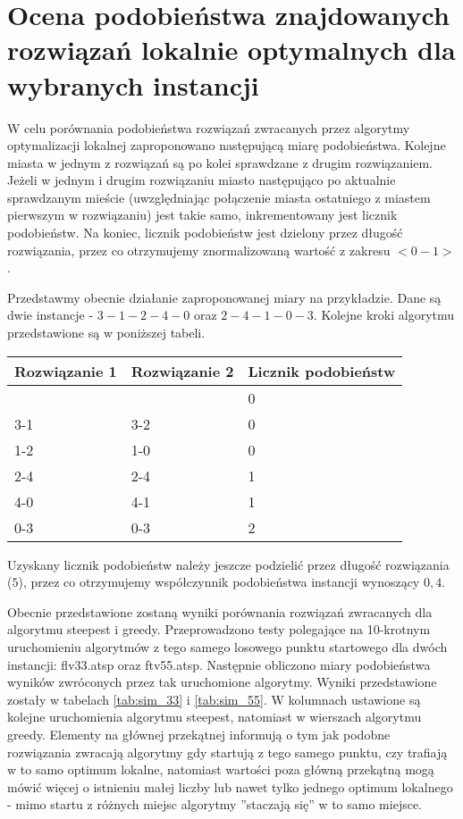 \section{Ocena podobieństwa znajdowanych rozwiązań lokalnie optymalnych dla wybranych instancji}
W celu porównania podobieństwa rozwiązań zwracanych przez algorytmy optymalizacji lokalnej zaproponowano następującą miarę podobieństwa. Kolejne miasta w jednym z rozwiązań są po kolei sprawdzane z drugim rozwiązaniem. Jeżeli w jednym i drugim rozwiązaniu miasto następująco po aktualnie sprawdzanym mieście (uwzględniając połączenie miasta ostatniego z miastem pierwszym w rozwiązaniu) jest takie samo, inkrementowany jest licznik podobieństw. Na koniec, licznik podobieństw jest dzielony przez długość rozwiązania, przez co otrzymujemy znormalizowaną wartość z zakresu $<0-1>$.

Przedstawmy obecnie działanie zaproponowanej miary na przykładzie. Dane są dwie instancje - $3-1-2-4-0$ oraz $2-4-1-0-3$. Kolejne kroki algorytmu przedstawione są w poniższej tabeli.

\begin{tabular}{|l|l|l|}
		\hline
		Rozwiązanie 1 & Rozwiązanie 2 & Licznik podobieństw\\
		\hline
		& & 0 \\
		3-1 & 3-2 & 0 \\
		1-2 & 1-0 & 0 \\
		2-4 & 2-4 & 1 \\
		4-0 & 4-1 & 1 \\
		0-3 & 0-3 & 2\\
		\hline
\end{tabular}

\noindent Uzyskany licznik podobieństw należy jeszcze podzielić przez długość rozwiązania ($5$), przez co otrzymujemy współczynnik podobieństwa instancji wynoszący $0,4$.

Obecnie przedstawione zostaną wyniki porównania rozwiązań zwracanych dla algorytmu steepest i greedy. Przeprowadzono testy polegające na 10-krotnym uruchomieniu algorytmów z tego samego losowego punktu startowego dla dwóch instancji: flv33.atsp oraz ftv55.atsp. Następnie obliczono miary podobieństwa wyników zwróconych przez tak uruchomione algorytmy. Wyniki przedstawione zostały w tabelach \ref{tab:sim_33} i \ref{tab:sim_55}. W kolumnach ustawione są kolejne uruchomienia algorytmu steepest, natomiast w wierszach algorytmu greedy. Elementy na głównej przekątnej informują o tym jak podobne rozwiązania zwracają algorytmy gdy startują z tego samego punktu, czy trafiają w to samo optimum lokalne, natomiast wartości poza główną przekątną mogą mówić więcej o istnieniu małej liczby lub nawet tylko jednego optimum lokalnego - mimo startu z różnych miejsc algorytmy ''staczają się'' w to samo miejsce.

